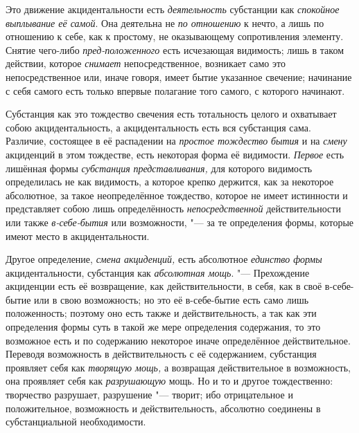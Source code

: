 Это движение акцидентальности есть {\em деятельность}
субстанции как {\em спокойное выплывание её самой}. Она
деятельна не {\em по отношению} к нечто, а лишь по
отношению к себе, как к простому, не оказывающему сопротивления элементу.
Снятие чего-либо {\em пред-положенного} есть исчезающая
видимость; лишь в таком действии, которое {\em снимает}
непосредственное, возникает само это непосредственное или, иначе говоря,
имеет бытие указанное свечение; начинание с себя самого есть только впервые
полагание того самого, с которого начинают.

Субстанция как это тождество свечения есть тотальность целого и охватывает
собою акцидентальность, а акцидентальность есть вся субстанция сама.
Различие, состоящее в её распадении на {\em простое
тождество} {\em бытия} и на
{\em смену} акциденций в этом тождестве, есть некоторая
форма её видимости. {\em Первое} есть лишённая формы
{\em субстанция}
{\em представливания,} для которого видимость
определилась не как видимость, а которое крепко держится, как за некоторое
абсолютное, за такое неопределённое тождество, которое не имеет истинности
и представляет собою лишь определённость
{\em непосредственной} действительности или также
{\em в-себе-бытия} или возможности, "--- за те определения
формы, которые имеют место в акцидентальности.

Другое определение, {\em смена акциденций,} есть
абсолютное {\em единство формы} акцидентальности,
субстанция как {\em абсолютная мощь}. "--- Прехождение
акциденции есть её возвращение, как действительности, в себя, как в своё
в-себе-бытие или в свою возможность; но это её в-себе-бытие есть само лишь
положенность; поэтому оно есть также и действительность, а так как эти
определения формы суть в такой же мере определения содержания, то это
возможное есть и по содержанию некоторое иначе определённое действительное.
Переводя возможность в действительность с её содержанием, субстанция
проявляет себя как {\em творящую мощь,} а возвращая
действительное в возможность, она проявляет себя как
{\em разрушающую} мощь. Но и то и другое тождественно:
творчество разрушает, разрушение "--- творит; ибо отрицательное и
положительное, возможность и действительность, абсолютно соединены в
субстанциальной необходимости.

